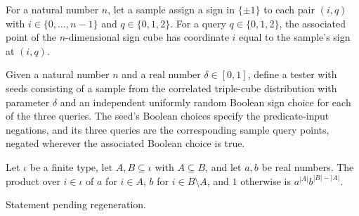 \begin{definition}
\label{FABL.oxrQueryPoint}
\leanok
{}
For a natural number $n$, let a sample assign a sign in $\{\pm1\}$ to each pair $(i,q)$
with $i\in\{0,\ldots,n-1\}$ and $q\in\{0,1,2\}$. For a query $q\in\{0,1,2\}$, the
associated point of the $n$-dimensional sign cube has coordinate $i$ equal to the
sample's sign at $(i,q)$.
\end{definition}

\begin{definition}
\label{FABL.oxrOddSignTester}
\leanok
{}
Given a natural number $n$ and a real number $\delta\in[0,1]$, define a tester with
seeds consisting of a sample from the correlated triple-cube distribution with parameter
$\delta$ and an independent uniformly random Boolean sign choice for each of the three
queries. The seed's Boolean choices specify the predicate-input negations, and its three
queries are the corresponding sample query points, negated wherever the associated
Boolean choice is true.
\end{definition}

\begin{theorem}
\label{FABL.prod_piecewise_two_sets}
\leanok
{}
Let $\iota$ be a finite type, let $A,B\subseteq\iota$ with $A\subseteq B$, and let $a,b$
be real numbers. The product over $i\in\iota$ of $a$ for $i\in A$, $b$ for $i\in
B\setminus A$, and $1$ otherwise is $a^{|A|}b^{|B|-|A|}$.
\end{theorem}

\begin{theorem}
\label{FABL.pmfExpectation_oxrTripleCubePMF_monomials}
\leanok
{}
Statement pending regeneration.
\end{theorem}

